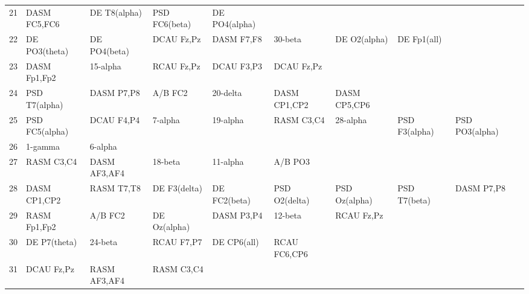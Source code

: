 \begin{landscape}
\begin{table}[]
\begin{tabular}{l|llllllll}
21       & DASM FC5,FC6   & DE T8(alpha)   & PSD FC6(beta)  & DE PO4(alpha)  &                &                &               &                &               &               \\
22       & DE PO3(theta)  & DE PO4(beta)   & DCAU Fz,Pz     & DASM F7,F8     & 30-beta        & DE O2(alpha)   & DE Fp1(all)   &                &               &               \\
23       & DASM Fp1,Fp2   & 15-alpha       & RCAU Fz,Pz     & DCAU F3,P3     & DCAU Fz,Pz     &                &               &                &               &               \\
24       & PSD T7(alpha)  & DASM P7,P8     & A/B FC2        & 20-delta       & DASM CP1,CP2   & DASM CP5,CP6   &               &                &               &               \\
25       & PSD FC5(alpha) & DCAU F4,P4     & 7-alpha        & 19-alpha       & RASM C3,C4     & 28-alpha       & PSD F3(alpha) & PSD PO3(alpha) &               &               \\
26       & 1-gamma        & 6-alpha        &                &                &                &                &               &                &               &               \\
27       & RASM C3,C4     & DASM AF3,AF4   & 18-beta        & 11-alpha       & A/B PO3        &                &               &                &               &               \\
28       & DASM CP1,CP2   & RASM T7,T8     & DE F3(delta)   & DE FC2(beta)   & PSD O2(delta)  & PSD Oz(alpha)  & PSD T7(beta)  & DASM P7,P8     &               &               \\
29       & RASM Fp1,Fp2   & A/B FC2        & DE Oz(alpha)   & DASM P3,P4     & 12-beta        & RCAU Fz,Pz     &               &                &               &               \\
30       & DE P7(theta)   & 24-beta        & RCAU F7,P7     & DE CP6(all)    & RCAU FC6,CP6   &                &               &                &               &               \\
31       & DCAU Fz,Pz     & RASM AF3,AF4   & RASM C3,C4     &                &                &                &               &                &               &               \\
\end{tabular}
\end{table}
\end{landscape}
\clearpage
